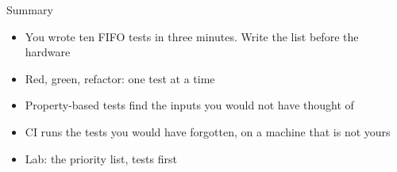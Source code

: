\begin{frame}{Summary}
	\begin{itemize}
		\item You wrote ten FIFO tests in three minutes. Write the list before the hardware
		\item Red, green, refactor: one test at a time
		\item Property-based tests find the inputs you would not have thought of
		\item CI runs the tests you would have forgotten, on a machine that is not yours
		\item Lab: the priority list, tests first
	\end{itemize}
\end{frame}


